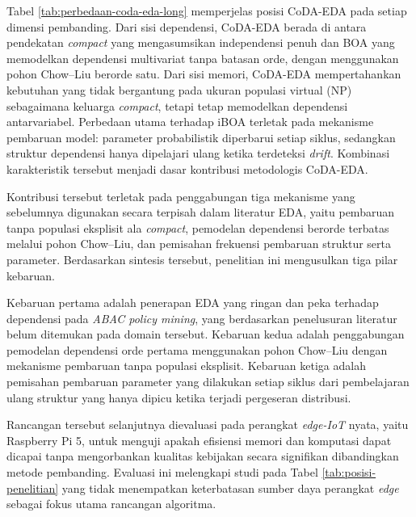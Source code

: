 Tabel \ref{tab:perbedaan-coda-eda-long} memperjelas posisi CoDA-EDA pada setiap dimensi pembanding. 
Dari sisi dependensi, CoDA-EDA berada di antara pendekatan \textit{compact} yang mengasumsikan independensi penuh dan BOA yang memodelkan dependensi multivariat tanpa batasan orde, dengan menggunakan pohon Chow–Liu berorde satu. 
Dari sisi memori, CoDA-EDA mempertahankan kebutuhan yang tidak bergantung pada ukuran populasi virtual (NP) sebagaimana keluarga \textit{compact}, tetapi tetap memodelkan dependensi antarvariabel. 
Perbedaan utama terhadap iBOA terletak pada mekanisme pembaruan model: parameter probabilistik diperbarui setiap siklus, sedangkan struktur dependensi hanya dipelajari ulang ketika terdeteksi \textit{drift}. 
Kombinasi karakteristik tersebut menjadi dasar kontribusi metodologis CoDA-EDA.

Kontribusi tersebut terletak pada penggabungan tiga mekanisme yang sebelumnya digunakan secara terpisah dalam literatur EDA, yaitu pembaruan tanpa populasi eksplisit ala \textit{compact}, pemodelan dependensi berorde terbatas melalui pohon Chow–Liu, dan pemisahan frekuensi pembaruan struktur serta parameter. 
Berdasarkan sintesis tersebut, penelitian ini mengusulkan tiga pilar kebaruan.

Kebaruan pertama adalah penerapan EDA yang ringan dan peka terhadap dependensi pada \textit{ABAC policy mining}, yang berdasarkan penelusuran literatur belum ditemukan pada domain tersebut. 
Kebaruan kedua adalah penggabungan pemodelan dependensi orde pertama menggunakan pohon Chow–Liu dengan mekanisme pembaruan tanpa populasi eksplisit. 
Kebaruan ketiga adalah pemisahan pembaruan parameter yang dilakukan setiap siklus dari pembelajaran ulang struktur yang hanya dipicu ketika terjadi pergeseran distribusi.

Rancangan tersebut selanjutnya dievaluasi pada perangkat \textit{edge-IoT} nyata, yaitu Raspberry Pi 5, untuk menguji apakah efisiensi memori dan komputasi dapat dicapai tanpa mengorbankan kualitas kebijakan secara signifikan dibandingkan metode pembanding. 
Evaluasi ini melengkapi studi pada Tabel \ref{tab:posisi-penelitian} yang tidak menempatkan keterbatasan sumber daya perangkat \textit{edge} sebagai fokus utama rancangan algoritma.